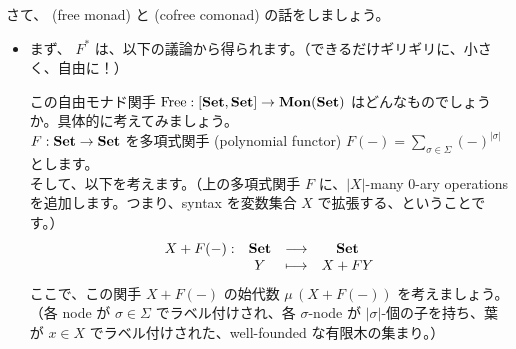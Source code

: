 \documentclass[
		head_space=20mm,
		foot_space=20mm,
		gutter=10mm,
		line_length=190mm
]{jlreq}
\begin{document}
\noindent さて、 (free monad) と (cofree comonad) の話をしましょう。\vspace{-2pt}
\begin{itemize}
	\item まず、 $F^\ast$ は、以下の議論から得られます。（できるだけギリギリに、小さく、自由に！）
	\begin{center}\small
	\end{center}
	この自由モナド関手 $\mathrm{Free}:[\mathbf{Set},\mathbf{Set}]\to\mathbf{Mon}(\mathbf{Set})$ はどんなものでしょうか。具体的に考えてみましょう。\vspace{0pt}\\ $F:\mathbf{Set}\to\mathbf{Set}$ を多項式関手 (polynomial functor) $F(-)=\sum_{\sigma\in\Sigma}(-)^{|\sigma|}$ とします。\\
	そして、以下を考えます。（上の多項式関手 $F$ に、$|X|$-many 0-ary operations を追加します。つまり、syntax を変数集合 $X$ で拡張する、ということです。）
	\[\begin{array}{cccc}
		X+F(-): & \mathbf{Set} & \longrightarrow & \mathbf{Set}\\
		& Y & \longmapsto & X+FY
	\end{array}\]
	ここで、この関手 $X+F(-)$ の始代数 $\mu \,(X+F(-))$ を考えましょう。（各 node が $\sigma\in\Sigma$ でラベル付けされ、各 $\sigma$-node が $|\sigma|$-個の子を持ち、葉が $x\in X$ でラベル付けされた、well-founded な有限木の集まり。）

\end{itemize}
\end{document}
